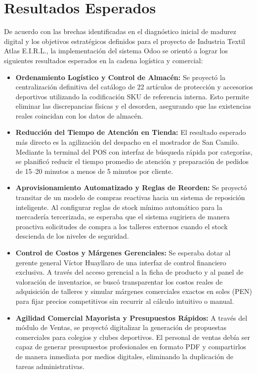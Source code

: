 \section{Resultados Esperados}

De acuerdo con las brechas identificadas en el diagnóstico inicial de madurez digital y los objetivos estratégicos definidos para el proyecto de Industria Textil Atlas E.I.R.L., la implementación del sistema Odoo se orientó a lograr los siguientes resultados esperados en la cadena logística y comercial:

\begin{itemize}
    \item \textbf{Ordenamiento Logístico y Control de Almacén:} Se proyectó la centralización definitiva del catálogo de 22 artículos de protección y accesorios deportivos utilizando la codificación SKU de referencia interna. Esto permite eliminar las discrepancias físicas y el desorden, asegurando que las existencias reales coincidan con los datos de almacén.
    \item \textbf{Reducción del Tiempo de Atención en Tienda:} El resultado esperado más directo es la agilización del despacho en el mostrador de San Camilo. Mediante la terminal del POS con interfaz de búsqueda rápida por categorías, se planificó reducir el tiempo promedio de atención y preparación de pedidos de 15--20 minutos a menos de 5 minutos por cliente.
    \item \textbf{Aprovisionamiento Automatizado y Reglas de Reorden:} Se proyectó transitar de un modelo de compras reactivas hacia un sistema de reposición inteligente. Al configurar reglas de stock mínimo automático para la mercadería tercerizada, se esperaba que el sistema sugiriera de manera proactiva solicitudes de compra a los talleres externos cuando el stock descienda de los niveles de seguridad.
    \item \textbf{Control de Costos y Márgenes Gerenciales:} Se esperaba dotar al gerente general Víctor Huayllaro de una interfaz de control financiero exclusiva. A través del acceso gerencial a la ficha de producto y al panel de valoración de inventarios, se buscó transparentar los costos reales de adquisición de talleres y simular márgenes comerciales exactos en soles (PEN) para fijar precios competitivos sin recurrir al cálculo intuitivo o manual.
    \item \textbf{Agilidad Comercial Mayorista y Presupuestos Rápidos:} A través del módulo de Ventas, se proyectó digitalizar la generación de propuestas comerciales para colegios y clubes deportivos. El personal de ventas debía ser capaz de generar presupuestos profesionales en formato PDF y compartirlos de manera inmediata por medios digitales, eliminando la duplicación de tareas administrativas.
\end{itemize}
